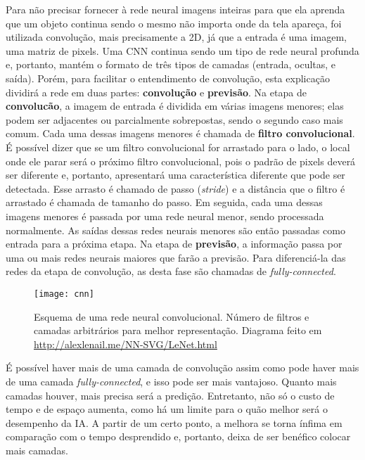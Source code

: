Para não precisar fornecer à rede neural imagens inteiras para que ela aprenda que um objeto continua sendo o mesmo não importa onde da tela apareça, foi utilizada convolução, mais precisamente a 2D, já que a entrada é uma imagem, uma matriz de pixels.
Uma CNN continua sendo um tipo de rede neural profunda e, portanto, mantém o formato de três tipos de camadas (entrada, ocultas, e saída). Porém, para facilitar o entendimento de convolução, esta explicação dividirá a rede em duas partes: \textbf{convolução} e \textbf{previsão}.
Na etapa de \textbf{convolucão}, a imagem de entrada é dividida em várias imagens menores; elas podem ser adjacentes ou parcialmente sobrepostas, sendo o segundo caso mais comum.
Cada uma dessas imagens menores é chamada de \textbf{filtro convolucional}.
É possível dizer que se um filtro convolucional for arrastado para o lado, o local onde ele parar será o próximo filtro convolucional, pois o padrão de pixels deverá ser diferente e, portanto, apresentará uma característica diferente que pode ser detectada.
Esse arrasto é chamado de passo (\textit{stride}) e a distância que o filtro é arrastado é chamada de tamanho do passo.
Em seguida, cada uma dessas imagens menores é passada por uma rede neural menor, sendo processada normalmente.
As saídas dessas redes neurais menores são então passadas como entrada para a próxima etapa.
Na etapa de \textbf{previsão}, a informação passa por uma ou mais redes neurais maiores que farão a previsão. Para diferenciá-la das redes da etapa de convolução, as desta fase são chamadas de \textit{fully-connected}.

\begin{figure}[h!]
\texttt{[image: cnn]}
\centering
\caption{Esquema de uma rede neural convolucional. Número de filtros e camadas arbitrários para melhor representação. Diagrama feito em \url{http://alexlenail.me/NN-SVG/LeNet.html}}
\end{figure}

É possível haver mais de uma camada de convolução assim como pode haver mais de uma camada \textit{fully-connected}, e isso pode ser mais vantajoso. 
Quanto mais camadas houver, mais precisa será a predição.
Entretanto, não só o custo de tempo e de espaço aumenta, como há um limite para o quão melhor será o desempenho da IA.
A partir de um certo ponto, a melhora se torna ínfima em comparação com o tempo desprendido e, portanto, deixa de ser benéfico colocar mais camadas.



